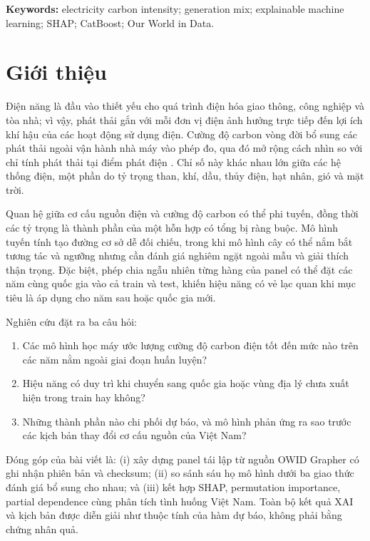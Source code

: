 \documentclass[11pt,a4paper]{article}
\begin{document}
\noindent\textbf{Keywords:} electricity carbon intensity; generation mix;
explainable machine learning; SHAP; CatBoost; Our World in Data.

\section{Giới thiệu}

Điện năng là đầu vào thiết yếu cho quá trình điện hóa giao thông, công nghiệp
và tòa nhà; vì vậy, phát thải gắn với mỗi đơn vị điện ảnh hưởng trực tiếp đến
lợi ích khí hậu của các hoạt động sử dụng điện. Cường độ carbon vòng đời bổ
sung các phát thải ngoài vận hành nhà máy vào phép đo, qua đó mở rộng cách nhìn
so với chỉ tính phát thải tại điểm phát điện \citep{owid_carbon,ember_method}.
Chỉ số này khác nhau lớn giữa các hệ thống điện, một phần do tỷ trọng than,
khí, dầu, thủy điện, hạt nhân, gió và mặt trời.

Quan hệ giữa cơ cấu nguồn điện và cường độ carbon có thể phi tuyến, đồng thời
các tỷ trọng là thành phần của một hỗn hợp có tổng bị ràng buộc. Mô hình tuyến
tính tạo đường cơ sở dễ đối chiếu, trong khi mô hình cây có thể nắm bắt tương
tác và ngưỡng nhưng cần đánh giá nghiêm ngặt ngoài mẫu và giải thích thận
trọng. Đặc biệt, phép chia ngẫu nhiên từng hàng của panel có thể đặt các năm
cùng quốc gia vào cả train và test, khiến hiệu năng có vẻ lạc quan khi mục
tiêu là áp dụng cho năm sau hoặc quốc gia mới.

Nghiên cứu đặt ra ba câu hỏi:
\begin{enumerate}[leftmargin=1.6em]
  \item Các mô hình học máy ước lượng cường độ carbon điện tốt đến mức nào
  trên các năm nằm ngoài giai đoạn huấn luyện?
  \item Hiệu năng có duy trì khi chuyển sang quốc gia hoặc vùng địa lý chưa
  xuất hiện trong train hay không?
  \item Những thành phần nào chi phối dự báo, và mô hình phản ứng ra sao trước
  các kịch bản thay đổi cơ cấu nguồn của Việt Nam?
\end{enumerate}

Đóng góp của bài viết là: (i) xây dựng panel tái lập từ nguồn OWID Grapher có
ghi nhận phiên bản và checksum; (ii) so sánh sáu họ mô hình dưới ba giao thức
đánh giá bổ sung cho nhau; và (iii) kết hợp SHAP, permutation importance,
partial dependence cùng phân tích tình huống Việt Nam. Toàn bộ kết quả XAI và
kịch bản được diễn giải như thuộc tính của hàm dự báo, không phải bằng chứng
nhân quả.
\end{document}

